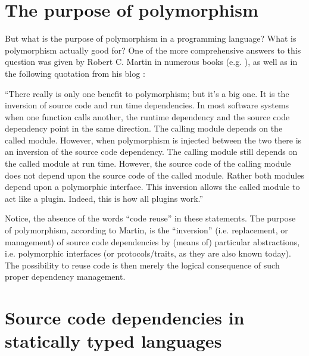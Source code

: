 \documentclass[11pt,oneside]{report}
\begin{document}
\section{The purpose of polymorphism}

But what is the purpose of polymorphism in a programming language?
What is polymorphism actually good for? One of the more comprehensive
answers to this question was given by Robert C. Martin in numerous
books (e.g. \cite{Martin_17}), as well as in the following quotation
from his blog \cite{Martin_14}:

\begin{displayquote}
``There really is only one benefit to polymorphism; but it's a big
  one. It is the inversion of source code and run time
  dependencies. In most software systems when one function calls
  another, the runtime dependency and the source code dependency point
  in the same direction. The calling module depends on the called
  module. However, when polymorphism is injected between the two there
  is an inversion of the source code dependency. The calling module
  still depends on the called module at run time. However, the source
  code of the calling module does not depend upon the source code of
  the called module. Rather both modules depend upon a polymorphic
  interface. This inversion allows the called module to act like a
  plugin. Indeed, this is how all plugins work.''
\end{displayquote}

Notice, the absence of the words ``code reuse'' in these statements.
The purpose of polymorphism, according to Martin, is the ``inversion''
(i.e. replacement, or management) of source code dependencies by
(means of) particular abstractions, i.e. polymorphic interfaces (or
protocols/traits, as they are also known today). The possibility to
reuse code is then merely the logical consequence of such proper
dependency management.

\section{Source code dependencies in statically typed languages}
\end{document}
